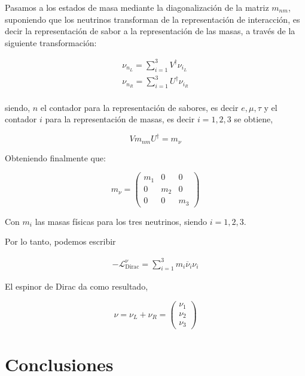 \documentclass[12pt]{article}
\begin{document}
Pasamos a los estados de masa mediante la diagonalización de la matriz $m_{nm}$, suponiendo que los neutrinos transforman de la representación de interacción, es decir la representación de sabor a la representación de las masas, a través de la siguiente transformación: 

\begin{equation}
    \begin{aligned}
    {\nu}_{n_L}= \sum_{i=1}^3 V^\dagger  {\nu}_{i_L} \\
    {\nu}_{n_R}= \sum_{i=1}^3 U^\dagger  {\nu}_{i_R} 
    \end{aligned}
\end{equation}\\

siendo, $n$ el contador para la representación de sabores, es decir $e,\mu, \tau $ y el contador $i$ para la representación de masas, es decir $i=1,2,3$ se obtiene, 

\begin{equation}
    Vm_{nm} U^\dagger=m_\nu
\end{equation}

Obteniendo finalmente que: 
 
\begin{equation}
    m_\nu=  \begin{pmatrix} m_1& 0 & 0  \\ 0 & m_2 & 0 \\ 0 &0 & m_3   \end{pmatrix} 
\end{equation} 

Con $m_i$ las masas físicas para los tres neutrinos,  siendo $i=1,2,3$.

Por lo tanto, podemos escribir 

\begin{align}
    \label{eq:Fiveth}
    -\mathcal{L}^\nu_{\text{Dirac}} =
       \sum_{i=1}^3 m_i \overline{\nu}_i\nu_i 
\end{align}

El espinor de Dirac da como resultado,


\begin{equation}
   \nu=  \nu_L+ \nu_R = \begin{pmatrix} \nu_1  \\  \nu_2 \\  \nu_3   \end{pmatrix} 
\end{equation} 


\section{Conclusiones}
\end{document}
